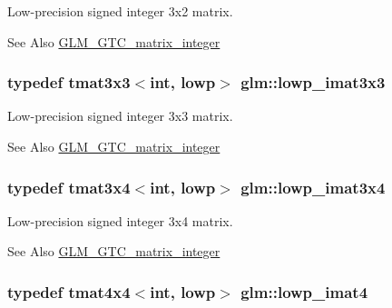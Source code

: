 Low-\/precision signed integer 3x2 matrix. \begin{DoxySeeAlso}{See Also}
\hyperlink{group__gtc__matrix__integer}{G\-L\-M\-\_\-\-G\-T\-C\-\_\-matrix\-\_\-integer} 
\end{DoxySeeAlso}
\hypertarget{group__gtc__matrix__integer_ga434abdeee9a8908660691be659f6693f}{
\subsubsection[{lowp\-\_\-imat3x3}]{\setlength{\rightskip}{0pt plus 5cm}typedef tmat3x3$<$int, lowp$>$ {\bf glm\-::lowp\-\_\-imat3x3}}}\label{group__gtc__matrix__integer_ga434abdeee9a8908660691be659f6693f}
Low-\/precision signed integer 3x3 matrix. \begin{DoxySeeAlso}{See Also}
\hyperlink{group__gtc__matrix__integer}{G\-L\-M\-\_\-\-G\-T\-C\-\_\-matrix\-\_\-integer} 
\end{DoxySeeAlso}
\hypertarget{group__gtc__matrix__integer_ga61fe3487c1f4f10fb0f5c9fa0873a694}{
\subsubsection[{lowp\-\_\-imat3x4}]{\setlength{\rightskip}{0pt plus 5cm}typedef tmat3x4$<$int, lowp$>$ {\bf glm\-::lowp\-\_\-imat3x4}}}\label{group__gtc__matrix__integer_ga61fe3487c1f4f10fb0f5c9fa0873a694}
Low-\/precision signed integer 3x4 matrix. \begin{DoxySeeAlso}{See Also}
\hyperlink{group__gtc__matrix__integer}{G\-L\-M\-\_\-\-G\-T\-C\-\_\-matrix\-\_\-integer} 
\end{DoxySeeAlso}
\hypertarget{group__gtc__matrix__integer_gad9a60f2ee78750d31b129c01096751b6}{
\subsubsection[{lowp\-\_\-imat4}]{\setlength{\rightskip}{0pt plus 5cm}typedef tmat4x4$<$int, lowp$>$ {\bf glm\-::lowp\-\_\-imat4}}}\label{group__gtc__matrix__integer_gad9a60f2ee78750d31b129c01096751b6}
